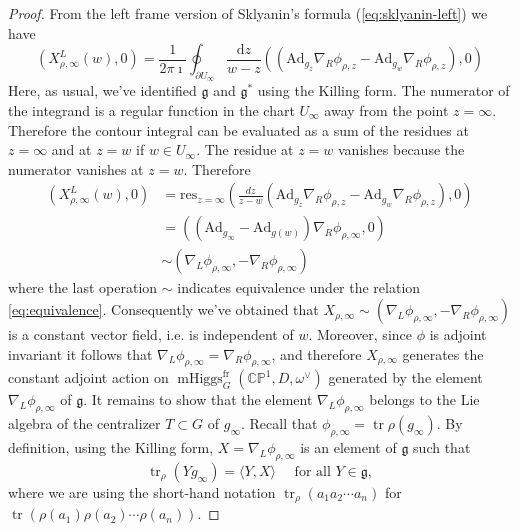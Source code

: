 \documentclass[11pt, oneside, reqno]{amsart}
\theoremstyle{definition} \newtheorem{definition}{Definition}[section]
\theoremstyle{definition} \newtheorem{remark}[definition]{Remark}
\theoremstyle{definition} \newtheorem{remarks}[definition]{Remarks}
\theoremstyle{definition} \newtheorem{question}[definition]{Question}
\theoremstyle{definition} \newtheorem*{note}{Note}
\theoremstyle{definition} \newtheorem{example}[definition]{Example}
\theoremstyle{definition} \newtheorem{examples}[definition]{Examples}
\renewcommand{\gg}{\mathfrak{g}}
\newcommand{\bb}[1]{\mathbb{#1}}
\newcommand{\mr}[1]{\mathrm{#1}}
\DeclareMathOperator{\tr}{tr}
\DeclareMathOperator{\mhiggs}{mHiggs}
\renewcommand{\d}{\mathrm{d}}
\newcommand{\fr}{\mathrm{fr}}
\newcommand{\Ad}{\mr{Ad}}
\begin{document}
 \begin{proof}
   From the left frame version of Sklyanin's formula (\ref{eq:sklyanin-left})  we have
   \begin{equation}
     (X^{L}_{\rho, \infty}(w),0)  =\frac{1}{2 \pi \imath} \oint_{\partial U_{\infty}} \frac{\d z}{w - z}
     ((\Ad_{g_z} \nabla_{R} \phi_{\rho, z} - \Ad_{g_{w}} \nabla_{R} \phi_{\rho, z} ), 0)
   \end{equation}
Here, as usual, we've identified $\gg$ and $\gg^{*}$ using the Killing form.  The numerator of the integrand is a regular function in the chart $U_{\infty}$ away from the point $z = \infty$.   Therefore the contour integral can be evaluated as a sum of the residues at $z=\infty$ and at $z = w$ if $w \in U_{\infty}$.  The residue at $z = w$ vanishes because the numerator vanishes at $z = w$. Therefore
   \begin{align*}
     (X^{L}_{\rho, \infty}(w),0)  &= \mathrm{res}_{z = \infty} (\frac{dz}{z - w}
     (\Ad_{g_z} \nabla_{R} \phi_{\rho,z}  - \Ad_{g_{w}} \nabla_{R} \phi_{\rho, z} ),0) \\
    &= ( (\Ad_{g_\infty} - \Ad_{g(w)}) \nabla_{R} \phi_{\rho, \infty} ,0) \\
    &\sim (\nabla_{L} \phi_{\rho, \infty}, - \nabla_{R} \phi_{\rho, \infty})
\end{align*}
where the last operation $\sim$ indicates equivalence under the relation \ref{eq:equivalence}. Consequently we've obtained that $X_{\rho, \infty} \sim (\nabla_{L} \phi_{\rho, \infty}, - \nabla_{R} \phi_{\rho, \infty})$ is a constant vector field, i.e. is independent of $w$. Moreover, since $\phi$ is adjoint invariant it follows that $\nabla_{L} \phi_{\rho, \infty} = \nabla_{R} \phi_{\rho, \infty}$, and therefore $X_{\rho, \infty}$ generates the constant adjoint action on $\mhiggs^\fr_G(\bb{CP}^1, D, \omega^\vee)$ generated by the element $\nabla_{L} \phi_{\rho, \infty} $ of $\gg$. It remains to show that the element $\nabla_{L} \phi_{\rho, \infty} $ belongs to the Lie
algebra of the centralizer $T \subset G$ of $g_{\infty}$.  Recall that $\phi_{\rho, \infty} = \tr \rho(g_\infty)$. By definition, using the Killing form,
$X = \nabla_{L} \phi_{\rho, \infty}$ is an element of $\gg$ such that
\[\tr_{\rho}(Y g_\infty)  = \langle Y, X \rangle \quad \text{ for all } Y \in \gg,\]
where we are using the short-hand notation $\tr_\rho(a_1 a_2 \cdots a_n)$ for $\tr(\rho(a_1)\rho(a_2) \cdots \rho(a_n))$.


\end{proof}
\end{document}
